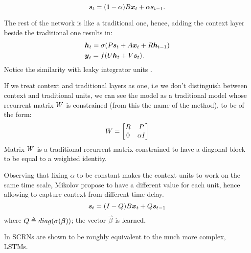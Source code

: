 \begin{equation}
 \boldsymbol{s}_t = (1-\alpha)B\boldsymbol{x}_t + \alpha\boldsymbol{s}_{t-1}.
\end{equation}

The rest of the network is like a traditional one, hence, adding the context layer beside the traditional one results 
in:
\begin{align}
 &\boldsymbol{h}_t = \sigma(P\boldsymbol{s}_t + A\boldsymbol{x}_t + R\boldsymbol{h}_{t-1})\\
 &\boldsymbol{y}_t = f(U\boldsymbol{h}_t + V\boldsymbol{s}_t).
\end{align}
Notice the similarity with leaky integrator units \cite{leakyIntegratorUnits}.

If we treat context and traditional layers as one, i.e we don't distinguish between context and traditional units, we can 
see the model as a traditional model whose recurrent matrix $W$ is constrained (from this the name of the 
method), to be of the form:
\begin{equation}
 W =  \begin{bmatrix}
R & P \\
0 & \alpha I
\end{bmatrix}
\end{equation}
Matrix $W$ is a traditional recurrent matrix constrained to have a diagonal block to be equal to a weighted 
identity. 

Observing that fixing $\alpha$ to be constant makes the context units to work on the same time scale, Mikolov propose 
to have a different value for each unit, hence allowing to capture context from different time delay.
\begin{equation}
  \boldsymbol{s}_t = (I-Q)B\boldsymbol{x}_t + Q\boldsymbol{s}_{t-1}
\end{equation}
where $Q\triangleq diag(\sigma(\boldsymbol{\beta}))$; the vector $\vec{\beta}$ is learned.

In \cite{scrn} SCRNs are shown to be roughly equivalent to the much more complex, LSTMs.


